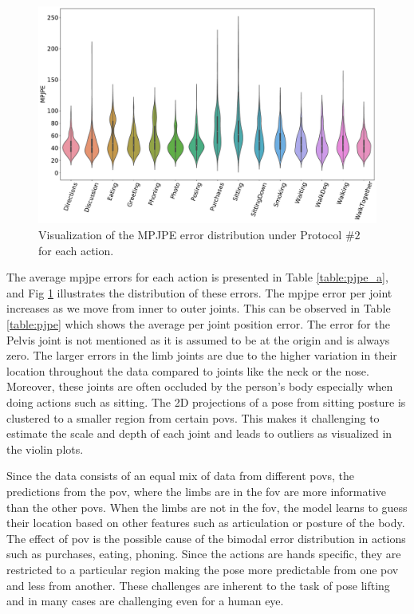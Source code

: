 \begin{figure}[h]
    \centering
    \includegraphics[width=\textwidth]{figures/results/violin_pjpe.pdf}
    \caption{Visualization of the MPJPE error distribution under Protocol $\#2$ for each action.}
    \label{fig:mpjpe_trends}
\end{figure}

The average \ac{mpjpe} errors for each action is presented in Table \ref{table:pjpe_a}, and Fig \ref{fig:mpjpe_trends} illustrates the distribution of these errors. The \ac{mpjpe} error per joint increases as we move from inner to outer joints. This can be observed in Table \ref{table:pjpe} which shows the average per joint position error. The error for the Pelvis joint is not mentioned as it is assumed to be at the origin and is always zero. The larger errors in the limb joints are due to the higher variation in their location throughout the data compared to joints like the neck or the nose. Moreover, these joints are often occluded by the person's body especially when doing actions such as sitting. The 2D projections of a pose from sitting posture is clustered to a smaller region from certain \acp{pov}. This makes it challenging to estimate the scale and depth of each joint and leads to outliers as visualized in the violin plots.

Since the data consists of an equal mix of data from different \acp{pov}, the predictions from the \ac{pov}, where the limbs are in the \ac{fov} are more informative than the other \acp{pov}. When the limbs are not in the \ac{fov}, the model learns to guess their location based on other features such as articulation or posture of the body. The effect of \ac{pov} is the possible cause of the bimodal error distribution in actions such as purchases, eating, phoning. Since the actions are hands specific, they are restricted to a particular region making the pose more predictable from one \ac{pov} and less from another. These challenges are inherent to the task of pose lifting and in many cases are challenging even for a human eye.


